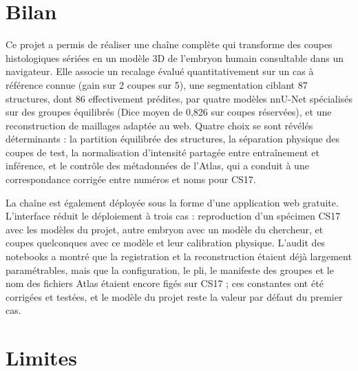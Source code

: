 \documentclass[12pt,a4paper]{report}
\begin{document}
\section*{Bilan}

Ce projet a permis de réaliser une chaîne complète qui transforme des coupes histologiques sériées en un modèle 3D de l'embryon humain consultable dans un navigateur. Elle associe un recalage évalué quantitativement sur un cas à référence connue (gain sur 2 coupes sur 5), une segmentation ciblant 87 structures, dont 86 effectivement prédites, par quatre modèles nnU-Net spécialisés sur des groupes équilibrés (Dice moyen de 0,826 sur coupes réservées), et une reconstruction de maillages adaptée au web. Quatre choix se sont révélés déterminants : la partition équilibrée des structures, la séparation physique des coupes de test, la normalisation d'intensité partagée entre entraînement et inférence, et le contrôle des métadonnées de l'Atlas, qui a conduit à une correspondance corrigée entre numéros et noms pour CS17.

La chaîne est également déployée sous la forme d'une application web gratuite. L'interface réduit le déploiement à trois cas : reproduction d'un spécimen CS17 avec les modèles du projet, autre embryon avec un modèle du chercheur, et coupes quelconques avec ce modèle et leur calibration physique. L'audit des notebooks a montré que la registration et la reconstruction étaient déjà largement paramétrables, mais que la configuration, le pli, le manifeste des groupes et le nom des fichiers Atlas étaient encore figés sur CS17 ; ces constantes ont été corrigées et testées, et le modèle du projet reste la valeur par défaut du premier cas.

\section*{Limites}
\end{document}
